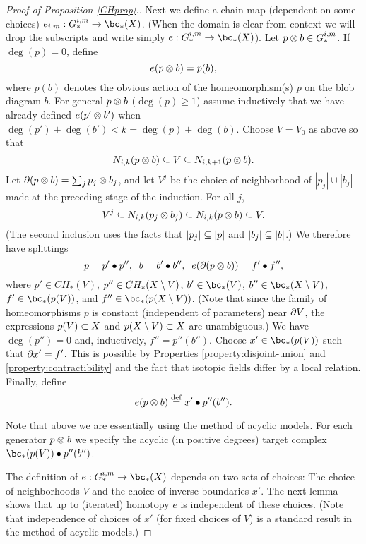 \begin{proof}[Proof of Proposition \ref{CHprop}.]
Next we define a chain map (dependent on some choices) $e_{i,m}: G_*^{i,m} \to \bc_*(X)$.
(When the domain is clear from context we will drop the subscripts and write
simply  $e: G_*^{i,m} \to \bc_*(X)$).
Let $p\otimes b \in G_*^{i,m}$.
If $\deg(p) = 0$, define
\[
	e(p\otimes b) = p(b) ,
\]
where $p(b)$ denotes the obvious action of the homeomorphism(s) $p$ on the blob diagram $b$.
For general $p\otimes b$ ($\deg(p) \ge 1$) assume inductively that we have already defined
$e(p'\otimes b')$ when $\deg(p') + \deg(b') < k = \deg(p) + \deg(b)$.
Choose $V = V_0$ as above so that 
\[
	N_{i,k}(p\otimes b) \subseteq V \subseteq N_{i,k+1}(p\otimes b) .
\]
Let $\partial(p\otimes b) = \sum_j p_j\otimes b_j$, and let $V^j$ be the choice of neighborhood
of $|p_j|\cup |b_j|$ made at the preceding stage of the induction.
For all $j$, 
\[
	V^j \subseteq N_{i,k}(p_j\otimes b_j) \subseteq N_{i,k}(p\otimes b) \subseteq V .
\]
(The second inclusion uses the facts that $|p_j| \subseteq |p|$ and $|b_j| \subseteq |b|$.)
We therefore have splittings
\[
	p = p'\bullet p'' , \;\; b = b'\bullet b'' , \;\; e(\partial(p\otimes b)) = f'\bullet f'' ,
\]
where $p' \in CH_*(V)$, $p'' \in CH_*(X\setminus V)$, 
$b' \in \bc_*(V)$, $b'' \in \bc_*(X\setmin V)$, 
$f' \in \bc_*(p(V))$, and $f'' \in \bc_*(p(X\setmin V))$.
(Note that since the family of homeomorphisms $p$ is constant (independent of parameters)
near $\partial V$, the expressions $p(V) \subset X$ and $p(X\setminus V) \subset X$ are
unambiguous.)
We have $\deg(p'') = 0$ and, inductively, $f'' = p''(b'')$.
Choose $x' \in \bc_*(p(V))$ such that $\partial x' = f'$.
This is possible by Properties \ref{property:disjoint-union} and \ref{property:contractibility}  and the fact that isotopic fields
differ by a local relation.
Finally, define
\[
	e(p\otimes b) \stackrel{\mathrm{def}}{=} x' \bullet p''(b'') .
\]

Note that above we are essentially using the method of acyclic models.
For each generator $p\otimes b$ we specify the acyclic (in positive degrees) 
target complex $\bc_*(p(V)) \bullet p''(b'')$.

The definition of $e: G_*^{i,m} \to \bc_*(X)$ depends on two sets of choices:
The choice of neighborhoods $V$ and the choice of inverse boundaries $x'$.
The next lemma shows that up to (iterated) homotopy $e$ is independent
of these choices.
(Note that independence of choices of $x'$ (for fixed choices of $V$)
is a standard result in the method of acyclic models.)



\end{proof}

